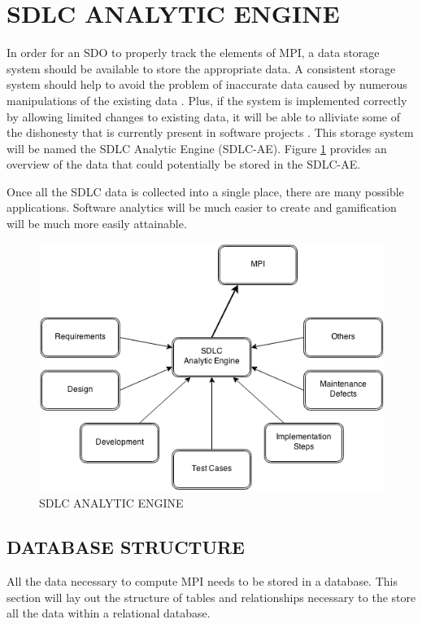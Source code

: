 \documentclass[SDSUThesis.tex]{subfiles}
\begin{document}
\section{SDLC ANALYTIC ENGINE}

In order for an SDO to properly track the elements of MPI, a data storage system should be available to store the appropriate data.  A consistent storage system should help to avoid the problem of inaccurate
data caused by numerous manipulations of the existing data \cite{Olson2003}. Plus, if the system
is implemented correctly by allowing limited changes to existing data, it will be able to alliviate
some of the dishonesty that is currently present in software projects \cite{Rost2011}. This storage system will be named the SDLC Analytic Engine (SDLC-AE). Figure \ref{fig:sdlc-ae} provides an overview of the data that could potentially be stored in the SDLC-AE.


Once all the SDLC data is collected into a single place, there are many possible applications.  Software analytics
will be much easier to create and gamification will be much more easily attainable.  

\begin{figure}[ht]
\includegraphics[scale=.7]{images/sdlc-ae.png}
\caption{SDLC ANALYTIC ENGINE}
\label{fig:sdlc-ae}
\end{figure}

\subsection{DATABASE STRUCTURE}
   All the data necessary to compute MPI needs to be stored in a database.  This section will 
   lay out the structure of tables and relationships necessary to the store all the data
   within a relational database.  
   
\end{document}
